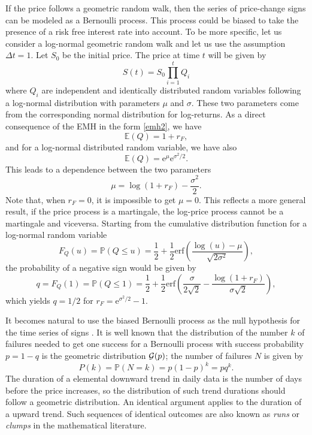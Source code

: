 \documentclass[a4paper]{jpconf}
\begin{document}
If the price follows a geometric random walk, then the series of price-change signs can be modeled as a Bernoulli process. This process could be biased to take the presence of a risk free interest rate into account. To be more specific, let us consider a log-normal geometric random walk and let us use the assumption $\Delta t =1$. Let $S_0$ be the initial price. The price at time $t$ will be given by
\begin{equation}
S(t)=S_0 \prod_{i=1}^t Q_i
\end{equation}
where $Q_i$ are independent and identically distributed random variables following a log-normal distribution with parameters $\mu$ and $\sigma$. These two parameters come from the corresponding normal distribution for log-returns. As a direct consequence of the EMH in the form \eqref{emh2}, we have
\begin{equation}
\mathbb{E} (Q) = 1 + r_F,
\end{equation}
and for a log-normal distributed random variable, we have also
\begin{equation}
\mathbb{E}(Q) = \mathrm{e}^\mu \mathrm{e}^{\sigma^2/2}.
\end{equation}
This leads to a dependence between the two parameters
\begin{equation}
\mu = \log(1+r_F) - \frac{\sigma^2}{2}.
\end{equation}
Note that, when $r_F = 0$, it is impossible to get $\mu=0$. This reflects a more general result, if the price process is a martingale, the log-price process cannot be a martingale and viceversa. Starting from the cumulative distribution function for a log-normal random variable
\begin{equation}
F_Q(u)=\mathbb{P}(Q \leq u) = \frac{1}{2} + \frac{1}{2} \mathrm{erf}\left(
\frac{\log(u) -\mu}{\sqrt{2 \sigma^2}} \right),
\end{equation}
the probability of a negative sign would be given by
\begin{equation}
q=F_Q(1)=\mathbb{P}(Q \leq 1)=\frac{1}{2} + \frac{1}{2} \mathrm{erf}\left(
\frac{\sigma}{2 \sqrt{2}} - \frac{\log (1+r_F)}{\sigma \sqrt{2}} \right),
\end{equation}
which yields $q=1/2$ for $r_F = \mathrm{e}^{\sigma^2/2}-1$.

It becomes natural to use the biased Bernoulli process as the null hypothesis for the time series of signs \cite{scalasold}. It is well known that the distribution of the number $k$ of failures needed to get one success for a Bernoulli process with success probability $p=1-q$ is the geometric distribution ${\cal{G}}(p)$; the number of failures $N$ is given by
\begin{equation}
P(k)=\mathbb{P}(N=k) = p(1 - p)^{k} = pq^{k}.
\end{equation}
The duration of a elemental downward trend in daily data is the number of days before the price increases, so the distribution of such trend durations should follow a geometric distribution. An identical argument applies to the duration of a upward trend. Such sequences of identical outcomes are also known as {\em runs} or {\em clumps} in the mathematical literature.
\end{document}
